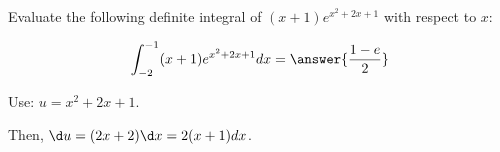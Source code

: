 \documentclass{ximera}
\author{Gregory Hartman \and Matthew Carr\and Nela Lakos}
\begin{document}
\begin{exercise}

Evaluate the following definite integral of $(x+1)e^{x^2+2x+1}$ with respect to $x$:

\[
\int_{-2}^{-1}(x+1)e^{x^2+2x+1} dx=\answer{\frac{1-e}{2}}
\]

\begin{hint}
Use: $u=x^2+2x+1$.
\end{hint}
\begin{hint}
Then,  $\d u=(2x+2)\d x=2(x+1) dx$.
\end{hint}
\end{exercise}
\end{document}
